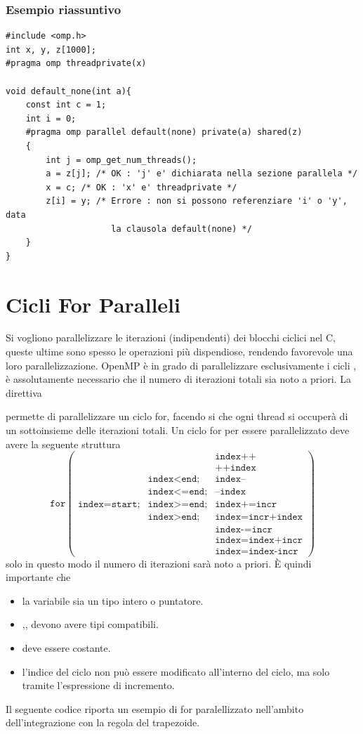 \documentclass[10pt, letterpaper]{report}
\begin{document}
\subsubsection{Esempio riassuntivo}
\begin{lstlisting}[style=CStyle]
#include <omp.h>
int x, y, z[1000];
#pragma omp threadprivate(x)

void default_none(int a){
    const int c = 1;
    int i = 0;
    #pragma omp parallel default(none) private(a) shared(z)
    {
        int j = omp_get_num_threads();
        a = z[j]; /* OK : 'j' e' dichiarata nella sezione parallela */
        x = c; /* OK : 'x' e' threadprivate */
        z[i] = y; /* Errore : non si possono referenziare 'i' o 'y', data 
                     la clausola default(none) */
    }
}
\end{lstlisting}
\flowerLine 
\section{Cicli For Paralleli}
Si vogliono parallelizzare le iterazioni (indipendenti) dei blocchi ciclici nel C, queste ultime sono spesso le operazioni più dispendiose, rendendo favorevole una loro parallelizzazione. OpenMP è in grado di parallelizzare esclusivamente i cicli , è assolutamente necessario che il numero di iterazioni totali sia noto a priori. La direttiva \begin{quote}
\end{quote}
permette di parallelizzare un ciclo for, facendo si che ogni thread si occuperà di un sottoinsieme delle iterazioni totali. Un ciclo for per essere parallelizzato deve avere la seguente struttura 
$$ \texttt{for}\begin{pmatrix}
    &&\texttt{index++}\\ 
    &&\texttt{++index}\\ 
    &\texttt{index<end;}&\texttt{index--}\\ 
    &\texttt{index<=end;}&\texttt{--index}\\ 
    \texttt{index=start;}&\texttt{index>=end;}&\texttt{index+=incr}\\ 
    &\texttt{index>end;}&\texttt{index=incr+index}\\ 
    &&\texttt{index-=incr}\\ 
    &&\texttt{index=index+incr}\\
    &&\texttt{index=index-incr}
\end{pmatrix}$$
solo in questo modo il numero di iterazioni sarà noto a priori. È quindi importante che\begin{itemize}
    \item la variabile  sia un tipo intero o puntatore. 
    \item {},, devono avere tipi compatibili. 
    \item {} deve essere costante. 
    \item l'indice del ciclo  non può essere modificato all'interno del ciclo, ma solo tramite l'espressione di incremento.
\end{itemize} Il seguente codice riporta un esempio di for paralellizzato nell'ambito dell'integrazione con la regola del trapezoide.
\end{document}
